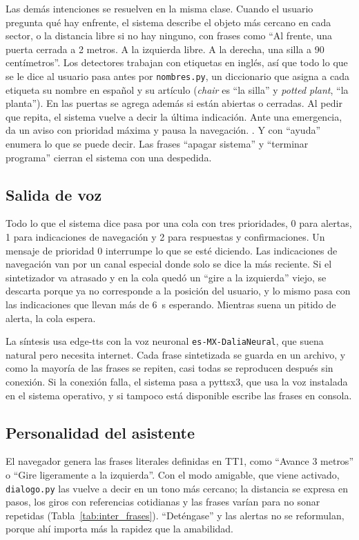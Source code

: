 Las demás intenciones se resuelven en la misma clase. Cuando el usuario pregunta qué
hay enfrente, el sistema describe el objeto más cercano en cada sector, o la distancia
libre si no hay ninguno, con frases como ``Al frente, una puerta cerrada a 2 metros. A
la izquierda libre. A la derecha, una silla a 90 centímetros''. Los detectores trabajan
con etiquetas en inglés, así que todo lo que se le dice al usuario pasa antes por
\texttt{nombres.py}, un diccionario que asigna a cada etiqueta su nombre en español y su
artículo (\emph{chair} es ``la silla'' y \emph{potted plant}, ``la planta''). En las
puertas se agrega además si están abiertas o cerradas. Al pedir que repita, el sistema vuelve a decir la última indicación. Ante una
emergencia, da un aviso con prioridad máxima y pausa la navegación. . Y con ``ayuda'' enumera lo que se puede decir. Las frases
``apagar sistema'' y ``terminar programa'' cierran el sistema con una despedida.

\subsection{Salida de voz}

Todo lo que el sistema dice pasa por una cola con tres prioridades, 0 para alertas, 1
para indicaciones de navegación y 2 para respuestas y confirmaciones. Un mensaje de
prioridad 0 interrumpe lo que se esté diciendo. Las indicaciones de navegación van por un
canal especial donde solo se dice la más reciente. Si el sintetizador va atrasado y en la
cola quedó un ``gire a la izquierda'' viejo, se descarta porque ya no corresponde a la
posición del usuario, y lo mismo pasa con las indicaciones que llevan más de 6~s
esperando. Mientras suena un pitido de alerta, la cola espera.

La síntesis usa edge-tts con la voz neuronal \texttt{es-MX-DaliaNeural}, que suena
natural pero necesita internet. Cada frase sintetizada se guarda en un archivo, y como la
mayoría de las frases se repiten, casi todas se reproducen después sin conexión. Si la
conexión falla, el sistema pasa a pyttsx3, que usa la voz instalada en el sistema
operativo, y si tampoco está disponible escribe las frases en consola.

\subsection{Personalidad del asistente}

El navegador genera las frases literales definidas en TT1, como ``Avance 3 metros'' o
``Gire ligeramente a la izquierda''. Con el modo amigable, que viene activado,
\texttt{dialogo.py} las vuelve a decir en un tono más cercano; la distancia se expresa en
pasos, los giros con referencias cotidianas y las frases varían para no sonar repetidas
(Tabla~\ref{tab:inter_frases}). ``Deténgase'' y las alertas no se reformulan, porque ahí
importa más la rapidez que la amabilidad.

